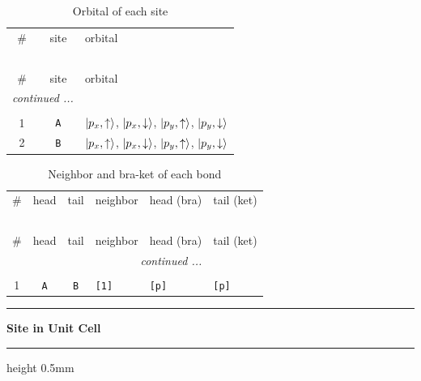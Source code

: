 \documentclass[fleqn,10pt,landscape]{jsarticle}
\begin{document}
\renewcommand{\arraystretch}{1.6}
\begin{longtable}[l]{ccl}
\captionsetup{justification=raggedright, singlelinecheck=off}
\caption{Orbital of each site}
 \\
 \hline \hline
\# & site & orbital \\ \hline \endfirsthead

\multicolumn{2}{l}{\tablename\ \thetable{}} \\
 \hline \hline
\# & site & orbital \\ \hline \endhead

 \hline \hline
\multicolumn{2}{r}{\footnotesize\it continued ...} \\ \endfoot

 \hline \hline
\multicolumn{2}{r}{} \\ \endlastfoot

1 & \texttt{A} & $\ket{p_{x},\uparrow}$, $\ket{p_{x},\downarrow}$, $\ket{p_{y},\uparrow}$, $\ket{p_{y},\downarrow}$ \\ \hline
2 & \texttt{B} & $\ket{p_{x},\uparrow}$, $\ket{p_{x},\downarrow}$, $\ket{p_{y},\uparrow}$, $\ket{p_{y},\downarrow}$ \\
\end{longtable}
\renewcommand{\arraystretch}{1.6}
\begin{longtable}[l]{ccclll}
\captionsetup{justification=raggedright, singlelinecheck=off}
\caption{Neighbor and bra-ket of each bond}
 \\
 \hline \hline
\# & head & tail & neighbor & head (bra) & tail (ket) \\ \hline \endfirsthead

\multicolumn{5}{l}{\tablename\ \thetable{}} \\
 \hline \hline
\# & head & tail & neighbor & head (bra) & tail (ket) \\ \hline \endhead

 \hline \hline
\multicolumn{5}{r}{\footnotesize\it continued ...} \\ \endfoot

 \hline \hline
\multicolumn{5}{r}{} \\ \endlastfoot

1 & \texttt{A} & \texttt{B} & \texttt{[1]} & \texttt{[p]} & \texttt{[p]} \\
\end{longtable}
\vspace{5mm}
\noindent \rule[0.5mm]{5mm}{0.5mm}\hspace{3mm}\textbf{Site in Unit Cell}\hspace{3mm}\leaders\hrule height 0.5mm\hfill\kern0pt
\vspace{3mm}
\end{document}
